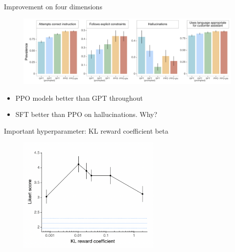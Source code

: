 \begin{vbframe}{Improvement on four dimensions}

\vfill

\begin{figure}
\centering
\includegraphics[width = 12cm]{figure/evaluationon4categories.png}
\end{figure}

\begin{itemize}
	\item PPO models better than GPT throughout
	\item SFT better than PPO on hallucinations. \ques  Why?
\end{itemize}

\vfill

\end{vbframe}

\begin{vbframe}{Important hyperparameter: KL reward
	coefficient beta}

\vfill

\begin{figure}
\centering
\includegraphics[width = 7cm]{figure/klrewardcoefficient.png}
\end{figure}

\vfill

\end{vbframe}


